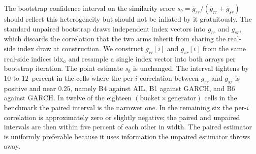 The bootstrap confidence interval on the similarity score $s_b = \bar{g}_{rr} / (\bar{g}_{rr} + \bar{g}_{sr})$ should reflect this heterogeneity but should not be inflated by it gratuitously. The standard unpaired bootstrap draws independent index vectors into $g_{rr}$ and $g_{sr}$, which discards the correlation that the two arms inherit from sharing the real-side index draw at construction. We construct $g_{rr}[i]$ and $g_{sr}[i]$ from the same real-side indices $\mathrm{idx}_a$ and resample a single index vector into both arrays per bootstrap iteration. The point estimate $s_b$ is unchanged. The interval tightens by $10$ to $12$~percent in the cells where the per-$i$ correlation between $g_{rr}$ and $g_{sr}$ is positive and near $0.25$, namely B4 against AIL, B1 against GARCH, and B6 against GARCH. In twelve of the eighteen $(\text{bucket}\times\text{generator})$ cells in the benchmark the paired interval is the narrower one. In the remaining six the per-$i$ correlation is approximately zero or slightly negative; the paired and unpaired intervals are then within five percent of each other in width. The paired estimator is uniformly preferable because it uses information the unpaired estimator throws away.

